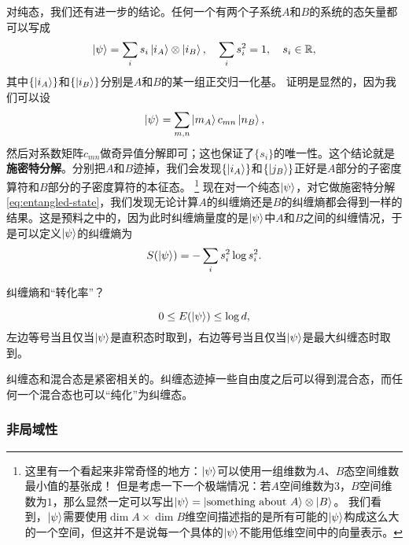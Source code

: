 \documentclass[UTF8, a4paper]{ctexart}
\begin{document}
对纯态，我们还有进一步的结论。任何一个有两个子系统$A$和$B$的系统的态矢量都可以写成
\begin{equation}
    \ket{\psi} = \sum_i s_i \ket{i_A} \otimes \ket{i_B}, \quad \sum_i s_i^2 = 1, \quad s_i \in \mathbb{R},
    \label{eq:entangled-state}
\end{equation}
其中$\{\ket{i_A}\}$和$\{\ket{i_B}\}$分别是$A$和$B$的某一组正交归一化基。
证明是显然的，因为我们可以设
\[
    \ket{\psi} = \sum_{m,n} \ket{m_A} c_{mn} \ket{n_B},
\]
然后对系数矩阵$c_{mn}$做奇异值分解即可；这也保证了$\{s_i\}$的唯一性。这个结论就是\textbf{施密特分解}。分别把$A$和$B$迹掉，我们会发现$\{\ket{i_A}\}$和$\{\ket{j_B}\}$正好是$A$部分的子密度算符和$B$部分的子密度算符的本征态。%
\footnote{
    这里有一个看起来非常奇怪的地方：$\ket{\psi}$可以使用一组维数为$A$、$B$态空间维数最小值的基张成！
    但是考虑一下一个极端情况：若$A$空间维数为$3$，$B$空间维数为$1$，那么显然一定可以写出$\ket{\psi}=\ket{\text{something about $A$}} \otimes \ket{B}$。
    我们看到，$\ket{\psi}$需要使用$\dim A \times \dim B$维空间描述指的是所有可能的$\ket{\psi}$构成这么大的一个空间，但这并不是说每一个具体的$\ket{\psi}$不能用低维空间中的向量表示。
}%
现在对一个纯态$\ket{\psi}$，对它做施密特分解\eqref{eq:entangled-state}，我们发现无论计算$A$的纠缠熵还是$B$的纠缠熵都会得到一样的结果。这是预料之中的，因为此时纠缠熵量度的是$\ket{\psi}$中$A$和$B$之间的纠缠情况，于是可以定义$\ket{\psi}$的纠缠熵为
\begin{equation}
    S(\ket{\psi}) = - \sum_i s_i^2 \log s_i^2.
\end{equation}

纠缠熵和“转化率”？

\begin{equation}
    0 \leq E(\ket{\psi}) \leq \log d,
\end{equation}
左边等号当且仅当$\ket{\psi}$是直积态时取到，右边等号当且仅当$\ket{\psi}$是最大纠缠态时取到。

纠缠态和混合态是紧密相关的。纠缠态迹掉一些自由度之后可以得到混合态，而任何一个混合态也可以“纯化”为纠缠态。

\subsubsection{非局域性}
\end{document}
